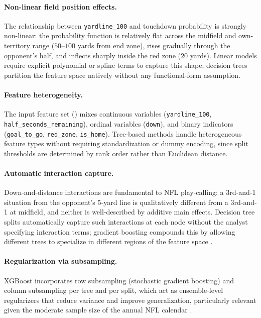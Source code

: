 \paragraph{Non-linear field position effects.}
The relationship between \texttt{yardline\_100} and touchdown probability is
strongly non-linear: the probability function is relatively flat across the
midfield and own-territory range ($50$--$100$ yards from end zone), rises
gradually through the opponent's half, and inflects sharply inside the
red zone ($20$ yards). Linear models require explicit polynomial or spline
terms to capture this shape; decision trees partition the feature space
natively without any functional-form assumption.

\paragraph{Feature heterogeneity.}
The input feature set () mixes continuous variables
(\texttt{yardline\_100}, \texttt{half\_seconds\_remaining}), ordinal variables
(\texttt{down}), and binary indicators (\texttt{goal\_to\_go},
\texttt{red\_zone}, \texttt{is\_home}). Tree-based methods handle heterogeneous
feature types without requiring standardization or dummy encoding,
since split thresholds are determined by rank order rather than Euclidean
distance.

\paragraph{Automatic interaction capture.}
Down-and-distance interactions are fundamental to NFL play-calling: a 3rd-and-1
situation from the opponent's 5-yard line is qualitatively different from a
3rd-and-1 at midfield, and neither is well-described by additive main effects.
Decision tree splits automatically capture such interactions at each node
without the analyst specifying interaction terms; gradient boosting compounds
this by allowing different trees to specialize in different regions of the
feature space \parencite{friedman2001gradientboosting}.

\paragraph{Regularization via subsampling.}
XGBoost incorporates row subsampling (stochastic gradient boosting) and
column subsampling per tree and per split, which act as ensemble-level
regularizers that reduce variance and improve generalization, particularly
relevant given the moderate sample size of the annual NFL calendar
\parencite{chen2016xgboost}.

